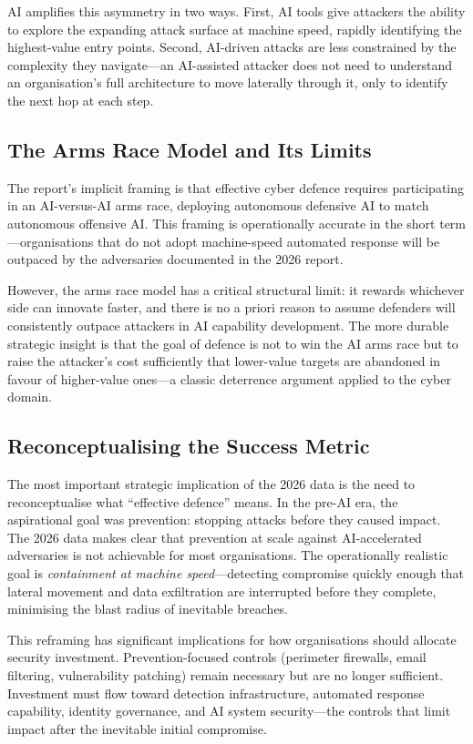 \documentclass[journal]{IEEEtran}
\begin{document}
AI amplifies this asymmetry in two ways. First, AI tools give attackers the ability
to explore the expanding attack surface at machine speed, rapidly identifying the
highest-value entry points. Second, AI-driven attacks are less constrained by the
complexity they navigate---an AI-assisted attacker does not need to understand an
organisation's full architecture to move laterally through it, only to identify the
next hop at each step.

\subsection{The Arms Race Model and Its Limits}

The report's implicit framing is that effective cyber defence requires participating
in an AI-versus-AI arms race, deploying autonomous defensive AI to match autonomous
offensive AI. This framing is operationally accurate in the short term---organisations
that do not adopt machine-speed automated response will be outpaced by the adversaries
documented in the 2026 report.

However, the arms race model has a critical structural limit: it rewards whichever
side can innovate faster, and there is no a priori reason to assume defenders will
consistently outpace attackers in AI capability development. The more durable
strategic insight is that the goal of defence is not to win the AI arms race but
to raise the attacker's cost sufficiently that lower-value targets are abandoned
in favour of higher-value ones---a classic deterrence argument applied to the
cyber domain.

\subsection{Reconceptualising the Success Metric}

The most important strategic implication of the 2026 data is the need to
reconceptualise what ``effective defence'' means. In the pre-AI era, the aspirational
goal was prevention: stopping attacks before they caused impact. The 2026 data makes
clear that prevention at scale against AI-accelerated adversaries is not achievable
for most organisations. The operationally realistic goal is \emph{containment at
machine speed}---detecting compromise quickly enough that lateral movement and data
exfiltration are interrupted before they complete, minimising the blast radius of
inevitable breaches.

This reframing has significant implications for how organisations should allocate
security investment. Prevention-focused controls (perimeter firewalls, email
filtering, vulnerability patching) remain necessary but are no longer sufficient.
Investment must flow toward detection infrastructure, automated response capability,
identity governance, and AI system security---the controls that limit impact after
the inevitable initial compromise.
\end{document}
